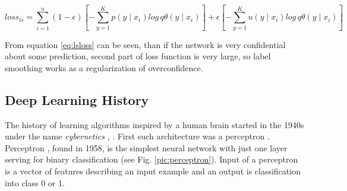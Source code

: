 \begin{equation} \label{eq:lsloss}
 loss_{ls}= \sum_{i=1}^{n} {(1- \epsilon)[- \sum_{y=1}^{K} p(y\mid x_i) log \, q\theta(y \mid x_i)]+\epsilon [- \sum_{y=1}^{K} u(y \mid x_i)log \, q\theta (y\mid x_i)]}
 \end{equation}

From equation \ref{eq:lsloss} can be seen, than if the network is very confidential about some prediction, second part of loss function is very large, so label smoothing works as a regularization of overconfidence.

\subsection{Deep Learning History}
The history of learning algorithms inspired by a human brain started in the 1940s under the name \textit{cybernetics} \citep{Goodfellow-et-al-2016}, \citep{McCulloch}. First such architecture was a perceptron \citep{Rosenblatt1958}.
Perceptron , found in 1958, is the simplest neural network with just one layer serving for binary classification (see Fig. \ref{pic:perceptron}). Input of a perceptron is a vector of features describing an input example and an output is classification into class 0 or 1.

